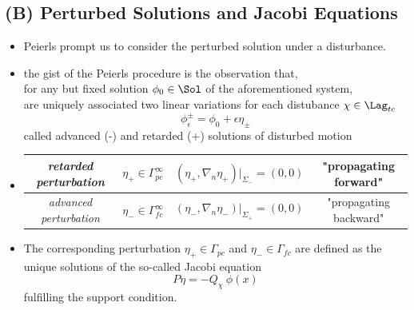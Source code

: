 \documentclass[a4paper,11pt]{scrartcl}
\begin{document}
    \subsection{(B) Perturbed Solutions and Jacobi Equations}
    \begin{itemize}
    	\item Peierls prompt us to consider the perturbed solution under a disturbance.
        \item the gist of the Peierls procedure is the observation that, \\
        for any but fixed  solution $\phi_0\in\Sol$ of the aforementioned system,\\
        are uniquely associated two linear variations for each distubance $\chi \in \Lag_{tc}$
        $$ \phi^\pm_\epsilon = \phi_0 + \epsilon \eta_\pm $$
        called advanced (-) and retarded (+)  solutions of disturbed motion \\
        \item
        \begin{tabular}{|c|c|c|c|}
               \hline
               \emph{retarded perturbation} & $\eta_+ \in \Gamma^\infty_{pc}$ & $(\eta_+, \nabla_n \eta_+ ) \big \vert_{\Sigma_{-}} = (0,0)$ & "propagating forward" \\
               \hline
               \emph{advanced perturbation} &$\eta_- \in \Gamma^\infty_{fc}$ & $(\eta_-, \nabla_n \eta_- ) \big \vert_{\Sigma_{+}} = (0,0)$ & "propagating backward" \\
               \hline
           \end{tabular}
           \item The corresponding perturbation  $\eta_+ \in \Gamma_{pc}$ and $\eta_- \in \Gamma_{fc}$ are defined as the unique solutions of the so-called Jacobi equation
           $$ P \eta = -Q_\chi \: \phi(x) $$
           fulfilling the support condition.
       \end{itemize}
\end{document}
